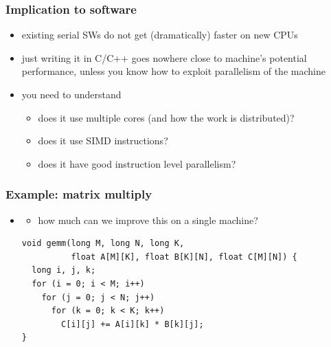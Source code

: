 \documentclass[12pt,dvipdfmx]{beamer}
\newcommand{\ao}[1]{{\color{blue}#1}}
\begin{document}
\begin{frame}
\frametitle{Implication to software}
\begin{itemize}
\item<1-> existing serial SWs do not get (dramatically) faster on new CPUs
\item<2-> just writing it in C/C++ goes nowhere close to machine's potential performance,
  unless you know how to exploit parallelism of the machine
\item<3-> you need to understand
  \begin{itemize}
  \item does it use multiple cores (and how the work is distributed)?
  \item does it use SIMD instructions?
  \item does it have good instruction level parallelism?
  \end{itemize}
\end{itemize}
\end{frame}

\begin{frame}[fragile]
\frametitle{Example: matrix multiply}

\begin{itemize}
\item []
  \begin{itemize}
  \item how much can we improve this on a single machine?
  \end{itemize}

\begin{lstlisting}
void gemm(long M, long N, long K,
          float A[M][K], float B[K][N], float C[M][N]) {
  long i, j, k;
  for (i = 0; i < M; i++)
    for (j = 0; j < N; j++)
      for (k = 0; k < K; k++)
        C[i][j] += A[i][k] * B[k][j];
}
\end{lstlisting}

\end{itemize}

\end{frame}
\end{document}
